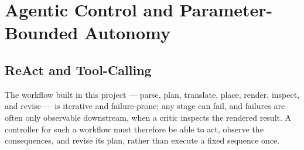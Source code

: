 %

\section{Agentic Control and Parameter-Bounded Autonomy}
\label{sec:background-agentic}

\subsection{ReAct and Tool-Calling}

The workflow built in this project --- parse, plan, translate, place,
render, inspect, and revise --- is iterative and failure-prone: any
stage can fail, and failures are often only observable downstream, when
a critic inspects the rendered result. A controller for such a
workflow must therefore be able to act, observe the consequences, and
revise its plan, rather than execute a fixed sequence once.

